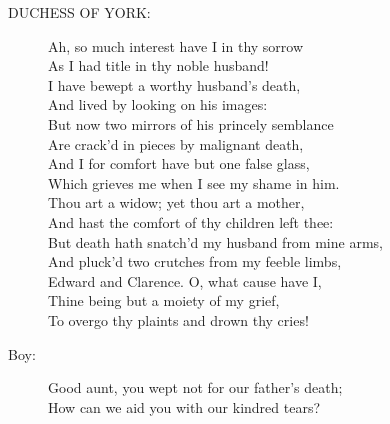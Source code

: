 \documentclass{article}
\begin{document}
\begin{description}
\item[DUCHESS OF YORK:] 
\hspace{1pt}Ah, so much interest have I in thy sorrow\\
\hspace{1pt}As I had title in thy noble husband!\\
\hspace{1pt}I have bewept a worthy husband's death,\\
\hspace{1pt}And lived by looking on his images:\\
\hspace{1pt}But now two mirrors of his princely semblance\\
\hspace{1pt}Are crack'd in pieces by malignant death,\\
\hspace{1pt}And I for comfort have but one false glass,\\
\hspace{1pt}Which grieves me when I see my shame in him.\\
\hspace{1pt}Thou art a widow; yet thou art a mother,\\
\hspace{1pt}And hast the comfort of thy children left thee:\\
\hspace{1pt}But death hath snatch'd my husband from mine arms,\\
\hspace{1pt}And pluck'd two crutches from my feeble limbs,\\
\hspace{1pt}Edward and Clarence. O, what cause have I,\\
\hspace{1pt}Thine being but a moiety of my grief,\\
\hspace{1pt}To overgo thy plaints and drown thy cries!\\
\end{description}
\begin{description}
\item[Boy:] 
\hspace{1pt}Good aunt, you wept not for our father's death;\\
\hspace{1pt}How can we aid you with our kindred tears?\\
\end{description}
\end{document}
